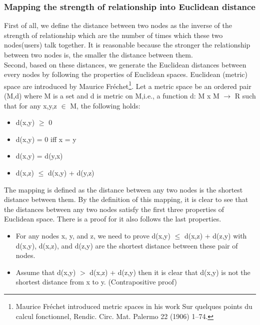 \documentclass[12pt, letterpaper]{article}
\begin{document}
  \subsubsection{Mapping the strength of relationship into Euclidean distance}
First of all, we define the distance between two nodes as the inverse of
the strength of relationship which are the number of times which these
two nodes(users) talk together. It is reasonable because the stronger
the relationship between two nodes is, the smaller the distance between
them.
\\Second, based on these distances, we generate the Euclidean distances
between every nodes by following the properties of Euclidean
spaces. Euclidean (metric) space are introduced by Maurice Fréchet\footnote{Maurice Fréchet introduced metric spaces in his work Sur quelques points du calcul fonctionnel, Rendic. Circ. Mat. Palermo 22 (1906) 1–74.}. Let
a metric space be an ordered pair (M,d) where M is a set and d is
metric on M,i.e., a function d: M x M $\rightarrow$ R such that for any x,y,z 
$\in$ M, the following holds: 
 \begin{itemize}
    \item d(x,y) $\geq$ 0 
    \item d(x,y) = 0 iff x = y
    \item d(x,y) = d(y,x)
    \item d(x,z) $\leq$ d(x,y) + d(y,z)
  \end{itemize}
The mapping is defined as the distance between any two nodes is the
shortest distance between them. By the definition of this
mapping, it is clear to see that the distances between any two nodes
satisfy the first three properties of Euclidean space. There is a
proof for it also follows the last properties.
  \begin{itemize}
    \item For any nodes x, y, and z, we need to prove d(x,y)  $\leq$
      d(x,z) + d(z,y) with d(x,y), d(x,z), and d(z,y) are the shortest
      distance between these pair of nodes.
    \item Assume that d(x,y) $>$ d(x,z) + d(z,y) then it is clear
      that d(x,y) is not the shortest distance from x to
      y. (Contrapositive proof)
  \end{itemize}
\end{document}
